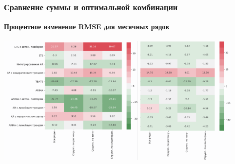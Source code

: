 \documentclass[c, dvipsnames]{beamer}  %
\begin{document}
\begin{frame}[shrink=5]
\frametitle{Сравнение суммы и оптимальной комбинации } 
\framesubtitle{Процентное изменение RMSE для месячных рядов}

\vfil
\hfil\hfil\includegraphics[height=6.5cm]{screenshot058}\hfil\hfil
\includegraphics[height=6.5cm]{screenshot061}\newline
\null\hfil\hfil{}
\hfil\hfil{}
\end{frame}
\end{document}
